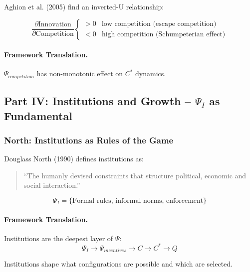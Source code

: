 Aghion et al. (2005) find an inverted-U relationship:

\begin{equation}
\frac{\partial \text{Innovation}}{\partial \text{Competition}} 
\begin{cases}
> 0 & \text{low competition (escape competition)} \\
< 0 & \text{high competition (Schumpeterian effect)}
\end{cases}
\end{equation}

\paragraph{Framework Translation.}
$\Psi_{competition}$ has non-monotonic effect on $C^*$ dynamics.

\subsection{Part IV: Institutions and Growth – $\Psi_I$ as Fundamental}

\subsubsection{North: Institutions as Rules of the Game}

Douglass North (1990) defines institutions as:
\begin{quote}
``The humanly devised constraints that structure political, economic and social interaction.''
\end{quote}

\begin{equation}
\boxed{
\Psi_I = \{\text{Formal rules, informal norms, enforcement}\}
}
\label{eq:north-institutions}
\end{equation}

\paragraph{Framework Translation.}
Institutions are the deepest layer of $\Psi$:
\begin{equation}
\Psi_I \to \Psi_{incentives} \to C \to C^* \to Q
\end{equation}

Institutions shape what configurations are possible and which are selected.

